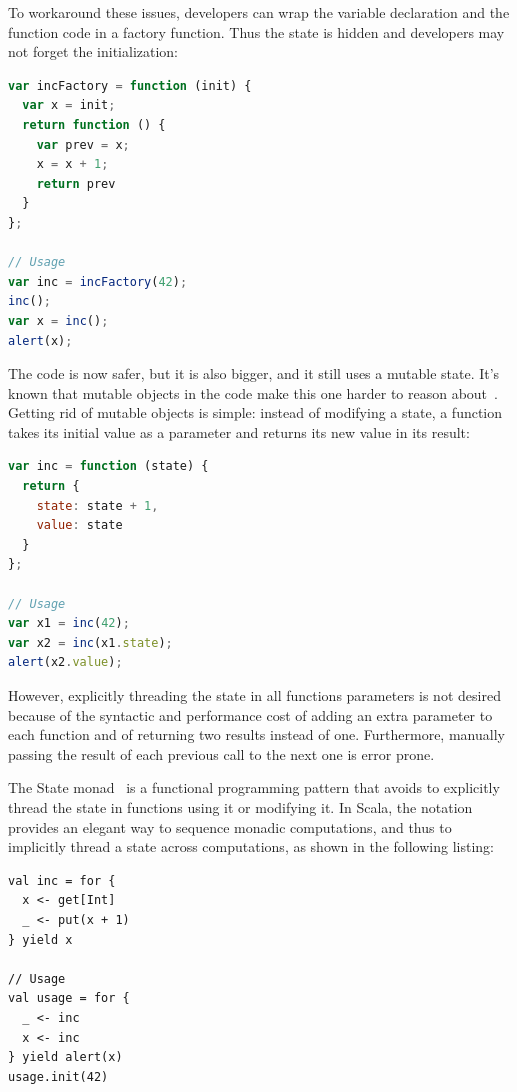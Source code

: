 \documentclass[american,english,runningheads]{llncs}
\begin{document}
To workaround these issues, developers can wrap the variable declaration and the  function code in a
factory function. Thus the state is hidden and developers may not forget the initialization:

\begin{lstlisting}[language=JavaScript,label=state-encapsulated,caption=State encapsulation within a function]
var incFactory = function (init) {
  var x = init;
  return function () {
    var prev = x;
    x = x + 1;
    return prev
  }
};

// Usage
var inc = incFactory(42);
inc();
var x = inc();
alert(x);
\end{lstlisting}

The code is now safer, but it is also bigger, and it still uses a mutable state. It’s known that mutable objects in
the code make this one harder to reason about~\cite{Grogono94_Immutability,Kjolstad11_Immutability}. Getting rid of
mutable objects is simple: instead of modifying a state, a function takes its initial value as a parameter and
returns its new value in its result:

\begin{lstlisting}[language=JavaScript,label=state-explicit,caption=Explicit state threading]
var inc = function (state) {
  return {
    state: state + 1,
    value: state
  }
};

// Usage
var x1 = inc(42);
var x2 = inc(x1.state);
alert(x2.value);
\end{lstlisting}

However, explicitly threading the state in all functions parameters is not desired because of the syntactic and
performance cost of adding an extra parameter to each function and of returning two results instead of one.
Furthermore, manually passing the result of each previous call to the next one is error prone.

The State monad~\cite{Wadler92_StateM} is a functional programming pattern that avoids to explicitly thread the state
in functions using it or modifying it. In Scala, the  notation provides an elegant way to sequence monadic
computations, and thus to implicitly thread a state across computations, as shown in the following listing:

\begin{lstlisting}[label=state-monad,caption=Implicitly threaded state using the State Monad]
val inc = for {
  x <- get[Int]
  _ <- put(x + 1)
} yield x

// Usage
val usage = for {
  _ <- inc
  x <- inc
} yield alert(x)
usage.init(42)
\end{lstlisting}
\end{document}
